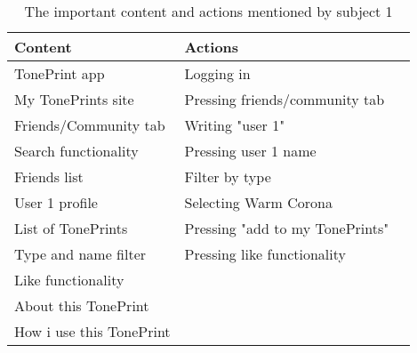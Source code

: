 \begin{table}[H]
\begin{minipage}[b]{\linewidth}\centering
	\begin{tabular} {|l|l|l|} \hline
		\rowcolor{xGray25} \textbf{Content} & \textbf{Actions} \\  \hline
		TonePrint app & Logging in \\
		My TonePrints site & Pressing friends/community tab \\
		Friends/Community tab & Writing "user 1" \\
		Search functionality & Pressing user 1 name \\
		Friends list & Filter by type \\
		User 1 profile & Selecting Warm Corona \\
		List of TonePrints & Pressing "add to my TonePrints" \\
		Type and name filter & Pressing like functionality \\
		Like functionality & \\
		About this TonePrint & \\
		How i use this TonePrint & \\ \hline
	\end{tabular}
	\caption{The important content and actions mentioned by subject 1}
	\label{tab:Subject1ContentActions}
\end{minipage}
\end{table}

